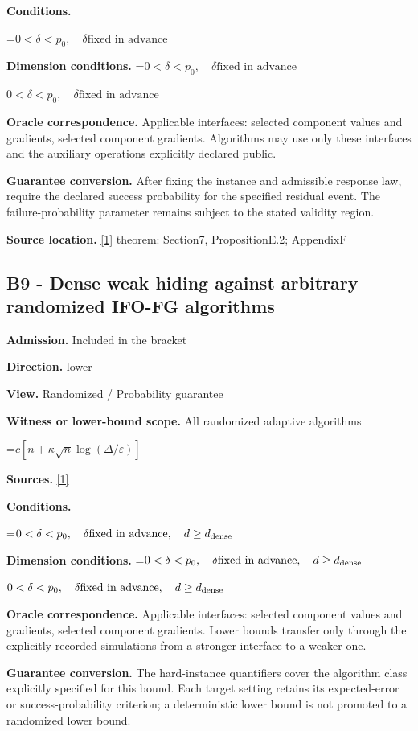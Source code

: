 \documentclass[10pt,a4paper]{article}
\newcommand{\AtlasMath}[1]{\par\begingroup\centering\setbox0=\hbox{$\displaystyle #1$}\ifdim\wd0>1.4\linewidth\typeout{ATLAS WIDE FORMULA: \the\wd0}\fi\ifdim\wd0>\linewidth\resizebox{\linewidth}{!}{\box0}\else\box0\fi\par\endgroup}
\newcommand{\AtlasInlineMath}[1]{\begingroup\setbox0=\hbox{$#1$}\ifdim\wd0>.4\linewidth\endgroup\AtlasMath{#1}\else\endgroup$#1$\fi}
\begin{document}
\textbf{Conditions.} 
\AtlasMath{0<\delta<p_0,\quad\delta\text{fixed in advance}}


\textbf{Dimension conditions.} \AtlasInlineMath{0<\delta<p_0,\quad\delta\text{fixed in advance}}

\textbf{Oracle correspondence.} Applicable interfaces: selected component values and gradients, selected component gradients. Algorithms may use only these interfaces and the auxiliary operations explicitly declared public.

\textbf{Guarantee conversion.} After fixing the instance and admissible response law, require the declared success probability for the specified residual event. The failure-probability parameter remains subject to the stated validity region.

\textbf{Source location.} \href{https://arxiv.org/pdf/2609.00045v3}{[1]} theorem: Section7, PropositionE.2; AppendixF

\subsection{B9 - Dense weak hiding against arbitrary randomized IFO-FG algorithms}
\textbf{Admission.} Included in the bracket

\textbf{Direction.} lower

\textbf{View.} Randomized / Probability guarantee

\textbf{Witness or lower-bound scope.} All randomized adaptive algorithms

\AtlasMath{c[n+\kappa\sqrt n\log(\Delta/\varepsilon)]}
\textbf{Sources.} \href{https://arxiv.org/pdf/2609.00045v3}{[1]}

\textbf{Conditions.} 
\AtlasMath{0<\delta<p_0,\quad\delta\text{fixed in advance},\quad d\ge d_{\rm dense}}


\textbf{Dimension conditions.} \AtlasInlineMath{0<\delta<p_0,\quad\delta\text{fixed in advance},\quad d\ge d_{\rm dense}}

\textbf{Oracle correspondence.} Applicable interfaces: selected component values and gradients, selected component gradients. Lower bounds transfer only through the explicitly recorded simulations from a stronger interface to a weaker one.

\textbf{Guarantee conversion.} The hard-instance quantifiers cover the algorithm class explicitly specified for this bound. Each target setting retains its expected-error or success-probability criterion; a deterministic lower bound is not promoted to a randomized lower bound.
\end{document}
